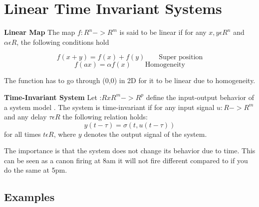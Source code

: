 \section{Linear Time Invariant Systems}

\textbf{Linear Map} \newline
The map $f: R^n -> R^m$ is said to be linear if for any $x,y \epsilon R^n$ and
$\alpha \epsilon R$, the following conditions hold

$$f(x+y) = f(x) + f(y)  \qquad \text{Super position}$$
$$f(ax) = \alpha f(x) \qquad \text{Homogeneity}$$

The function has to go through (0,0) in 2D for it to be linear due to homogeneity.


\textbf{Time-Invariant System} \newline
Let \sigma:$ R x R^m -> R^p$ define the input-output behavior of a system model \SUM.
The system \SUM is time-invariant if for any input signal $u:R->R^m$
and any delay $\tau \epsilon R$ the following relation holds:
$$ y(t-\tau)= \sigma(t,u(t-\tau))$$
for all times $t\epsilon R$, where $y$ denotes the output signal of the system.

The importance is that the system does not change its behavior due to time.
This can be seen as a canon firing at 8am it will not fire different
compared to if you do the same at 5pm.
\subsection{Examples}
